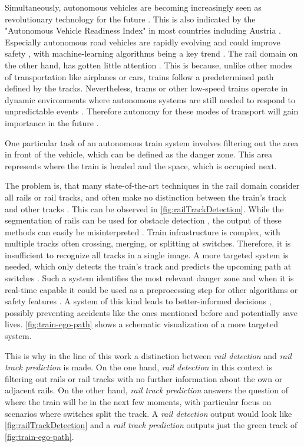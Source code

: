 Simultaneously, autonomous vehicles are becoming increasingly seen as revolutionary technology for the future \cite{FraunhoferInstituteforCognitiveSystemsIKS}.
This is also indicated by the "Autonomous Vehicle Readiness Index" \cite{autonomousVehicleReadinessIndex} in most countries including Austria \cite{autonomousVehicleReadinessCounties}.
Especially autonomous road vehicles are rapidly evolving and could improve safety \cite{railsem19dataset} \cite{tepNet2024}, with machine-learning algorithms being a key trend \cite{railsem19dataset}.
The rail domain on the other hand, has gotten little attention \cite{railsem19dataset}.
This is because, unlike other modes of transportation like airplanes or cars, trains follow a predetermined path defined by the tracks.
Nevertheless, trams or other low-speed trains operate in dynamic environments where autonomous systems are still needed to respond to unpredictable events \cite{tepNet2024}.
Therefore autonomy for these modes of transport will gain importance in the future \cite{railNet2019}.

One particular task of an autonomous train system involves filtering out the area in front of the vehicle, which can be defined as the danger zone.
This area represents where the train is headed and the space, which is occupied next.

The problem is, that many state-of-the-art techniques in the rail domain consider all rails or rail tracks, and often make no distinction between the train's track and other tracks \cite{tepNet2024}.
This can be observed in \autoref{fig:railTrackDetection}.
While the segmentation of rails can be used for obstacle detection \cite{railNet2019}, the output of these methods can easily be misinterpreted \cite{tepNet2024}.
Train infrastructure is complex, with multiple tracks often crossing, merging, or splitting at switches. Therefore, it is insufficient to recognize all tracks in a single image.
A more targeted system is needed, which only detects the train's track and predicts the upcoming path at switches \cite{tepNet2024}.
Such a system identifies the most relevant danger zone and when it is real-time capable it could be used as a preprocessing step for other algorithms or safety features \cite{tepNet2024} \cite{railNet2019}.
A system of this kind leads to better-informed decisions \cite{tepNet2024}, possibly preventing accidents like the ones mentioned before and potentially save lives.
\autoref{fig:train-ego-path} shows a schematic visualization of a more targeted system.

This is why in the line of this work a distinction between \textit{rail detection} and \textit{rail track prediction} is made.
On the one hand, \textit{rail detection} in this context is filtering out rails or rail tracks with no further information about the own or adjacent rails.
On the other hand, \textit{rail track prediction} answers the question of where the train will be in the next few moments, with particular focus on scenarios where switches split the track.
A \textit{rail detection} output would look like \autoref{fig:railTrackDetection} and a \textit{rail track prediction} outputs just the green track of \autoref{fig:train-ego-path}.

